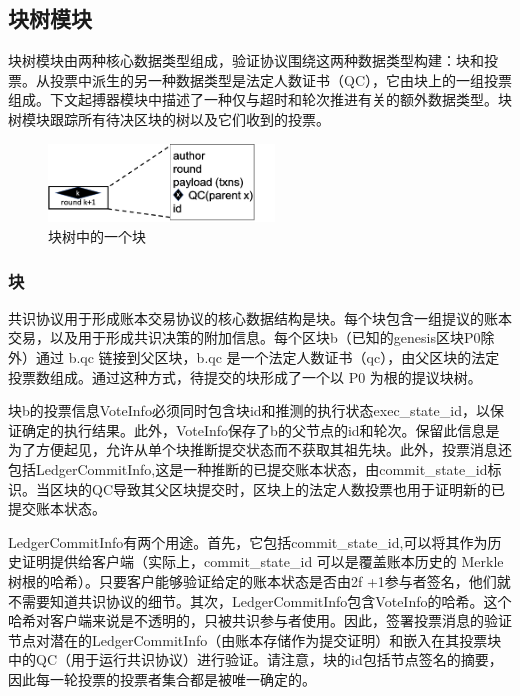 \subsection{块树模块}

块树模块由两种核心数据类型组成，验证协议围绕这两种数据类型构建：块和投票。从投票中派生的另一种数据类型是法定人数证书（QC），它由块上的一组投票组成。下文起搏器模块中描述了一种仅与超时和轮次推进有关的额外数据类型。块树模块跟踪所有待决区块的树以及它们收到的投票。

\begin{figure}[htbp]
    \centering
    \includegraphics[width=6cm]{figures/image5.png}
    \caption{块树中的一个块}
    \label{image5}
\end{figure}

\subsubsection{块}

共识协议用于形成账本交易协议的核心数据结构是块。每个块包含一组提议的账本交易，以及用于形成共识决策的附加信息。每个区块b（已知的genesis区块P0除外）通过 b.qc 链接到父区块，b.qc 是一个法定人数证书（qc），由父区块的法定投票数组成。通过这种方式，待提交的块形成了一个以 P0 为根的提议块树。

块b的投票信息VoteInfo必须同时包含块id和推测的执行状态exec\_state\_id，以保证确定的执行结果。此外，VoteInfo保存了b的父节点的id和轮次。保留此信息是为了方便起见，允许从单个块推断提交状态而不获取其祖先块。此外，投票消息还包括LedgerCommitInfo,这是一种推断的已提交账本状态，由commit\_state\_id标识。当区块的QC导致其父区块提交时，区块上的法定人数投票也用于证明新的已提交账本状态。

LedgerCommitInfo有两个用途。首先，它包括commit\_state\_id,可以将其作为历史证明提供给客户端（实际上，commit\_state\_id 可以是覆盖账本历史的 Merkle树根的哈希）。只要客户能够验证给定的账本状态是否由2f +1参与者签名，他们就不需要知道共识协议的细节。其次，LedgerCommitInfo包含VoteInfo的哈希。这个哈希对客户端来说是不透明的，只被共识参与者使用。因此，签署投票消息的验证节点对潜在的LedgerCommitInfo（由账本存储作为提交证明）和嵌入在其投票块中的QC（用于运行共识协议）进行验证。请注意，块的id包括节点签名的摘要，因此每一轮投票的投票者集合都是被唯一确定的。


